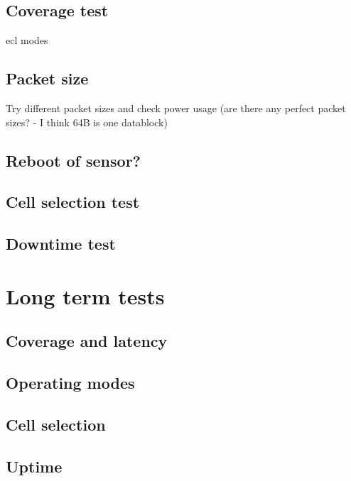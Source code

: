 \documentclass[USenglish]{ifimaster}  %
\begin{document}
\subsection{Coverage test} \label{ssection:coveragetest}
\acrshort{ecl} modes

\subsection{Packet size} \label{ssection:packetsize}
Try different packet sizes and check power usage (are there any perfect packet sizes? - I think 64B is one datablock)

\subsection{Reboot of sensor?} \label{ssection:reboottest}

\subsection{Cell selection test} \label{ssection:cellselectiontest}

\subsection{Downtime test} \label{ssection:downtimetest}


\section{Long term tests} \label{section:longtermtest}

\subsection{Coverage and latency}

\subsection{Operating modes}

\subsection{Cell selection}

\subsection{Uptime}
\end{document}
